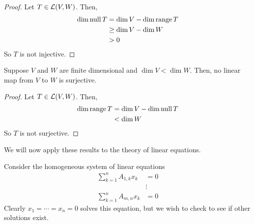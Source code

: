 \begin{proof}
    Let $T \in \mathcal{L}(V,W)$. Then,
    \begin{align*}
        \dim \operatorname{null} T &= \dim V - \dim \operatorname{range} T \\
        &\ge  \dim V -\dim W \\
        &> 0
    \end{align*}
    So $T$ is not injective.
\end{proof}
\begin{theorem}
    Suppose $V$ and $W$ are finite dimensional and $\dim V < \dim W$. Then, no linear map from $V$ to $W$ is surjective.
\end{theorem}
\begin{proof}
    Let $T\in \mathcal{L}(V,W)$. Then,
    \begin{align*}
        \dim \operatorname{range} T &= \dim V - \dim \operatorname{null} T \\
        &< \dim W
    \end{align*}
    So $T$ is not surjective.
\end{proof}
We will now apply these results to the theory of linear equations. 

Consider the homogeneous system of linear equations
\begin{align*}
    \sum_{k=1}^n A_{1,k}x_k &= 0 \\
    &\vdots \\
    \sum_{k=1}^n A_{m,n}x_k &= 0
\end{align*}
Clearly $x_1 = \cdots = x_n = 0$ solves this equation, but we wish to check to see if other solutions exist. 


